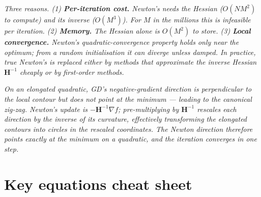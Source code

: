 \documentclass[11pt, a4paper]{article}
\begin{document}
\begin{exambox}
\textit{Three reasons. (1) \textbf{Per-iteration cost.} Newton's needs the Hessian ($O(NM^2)$ to compute) and its inverse ($O(M^3)$). For $M$ in the millions this is infeasible per iteration. (2) \textbf{Memory.} The Hessian alone is $O(M^2)$ to store. (3) \textbf{Local convergence.} Newton's quadratic-convergence property holds only near the optimum; from a random initialisation it can diverge unless damped. In practice, true Newton's is replaced either by methods that approximate the inverse Hessian $\mathbf{H}^{-1}$ cheaply or by first-order methods.}
\end{exambox}

\begin{exambox}
\textit{On an elongated quadratic, GD's negative-gradient direction is perpendicular to the local contour but does \emph{not} point at the minimum — leading to the canonical zig-zag. Newton's update is $-\mathbf{H}^{-1}\nabla f$; pre-multiplying by $\mathbf{H}^{-1}$ rescales each direction by the inverse of its curvature, effectively transforming the elongated contours into circles in the rescaled coordinates. The Newton direction therefore points exactly at the minimum on a quadratic, and the iteration converges in one step.}
\end{exambox}

\section*{Key equations cheat sheet}
\end{document}
